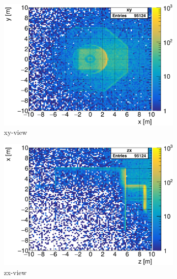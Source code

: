 \begin{figure}[h]
 \centering
  \begin{subfigure}[b]{0.45\textwidth}
   \centering
    \includegraphics[width=\textwidth]{Figures/BeamDump/neutrons_EndpointMap_xy.png}
   \caption{xy-view}
   \end{subfigure}
   \hfill
   \begin{subfigure}[b]{0.45\textwidth}
   \centering
    \includegraphics[width=\textwidth]{Figures/BeamDump/neutrons_EndpointMap_zx.png}
   \caption{zx-view}
   \end{subfigure}\\
    \begin{subfigure}[b]{0.45\textwidth}
   \centering

\end{subfigure}
\end{figure}
